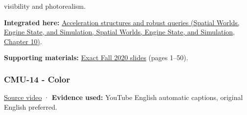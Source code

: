 visibility and photorealism.

\textbf{Integrated here:} \href{../05-Spatial-Worlds-Engine-State-and-Simulation/main.pdf\#nameddest=04-visual-computing-ii-ch029-acceleration-structures-and-robust-queries-1}{Acceleration structures and robust queries (Spatial Worlds, Engine State, and Simulation, Spatial Worlds, Engine State, and Simulation, Chapter 10)}.

\textbf{Supporting materials:} \href{https://15462.courses.cs.cmu.edu/fall2020content/lectures/13_spatialdatastructures/13_spatialdatastructures_slides.pdf}{Exact Fall 2020 slides} (pages 1--50).

\subsubsection{CMU-14 - Color}\label{04-visual-computing-ii-ch036-cmu-14---color}

\href{https://www.youtube.com/watch?v=77WBg0Mprt0}{Source video} · \textbf{Evidence used:} YouTube English automatic captions, original English preferred.

